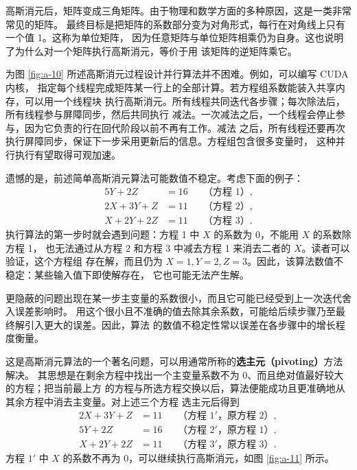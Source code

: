 高斯消元后，矩阵变成三角矩阵。由于物理和数学方面的多种原因，这是一类非常常见的矩阵。
最终目标是把矩阵的系数部分变为对角形式，每行在对角线上只有一个值 1。这称为单位矩阵，
因为任意矩阵与单位矩阵相乘仍为自身。这也说明了为什么对一个矩阵执行高斯消元，等价于用
该矩阵的逆矩阵乘它。

为图 \ref{fig:a-10} 所述高斯消元过程设计并行算法并不困难。例如，可以编写 CUDA 内核，
指定每个线程完成矩阵某一行上的全部计算。若方程组系数能装入共享内存，可以用一个线程块
执行高斯消元。所有线程共同迭代各步骤；每次除法后，所有线程参与屏障同步，然后共同执行
减法。一次减法之后，一个线程会停止参与，因为它负责的行在回代阶段以前不再有工作。减法
之后，所有线程还要再次执行屏障同步，保证下一步采用更新后的信息。方程组包含很多变量时，
这种并行执行有望取得可观加速。

遗憾的是，前述简单高斯消元算法可能数值不稳定。考虑下面的例子：
\[
\begin{aligned}
  5Y+2Z&=16 &&\text{（方程 1）},\\
  2X+3Y+Z&=11 &&\text{（方程 2）},\\
  X+2Y+2Z&=11 &&\text{（方程 3）}.
\end{aligned}
\]
执行算法的第一步时就会遇到问题：方程 1 中 $X$ 的系数为 0，不能用 $X$ 的系数除方程 1，
也无法通过从方程 2 和方程 3 中减去方程 1 来消去二者的 $X$。读者可以验证，这个方程组
存在解，而且仍为 $X=1,Y=2,Z=3$。因此，该算法数值不稳定：某些输入值下即使解存在，
它也可能无法产生解。

更隐蔽的问题出现在某一步主变量的系数很小，而且它可能已经受到上一次迭代舍入误差影响时。
用这个很小且不准确的值去除其余系数，可能给后续步骤乃至最终解引入更大的误差。因此，算法
的数值不稳定性常以误差在各步骤中的增长程度衡量。

这是高斯消元算法的一个著名问题，可以用通常所称的\textbf{选主元（pivoting）}方法解决。
其思想是在剩余方程中找出一个主变量系数不为 0、而且绝对值最好较大的方程；把当前最上方
的方程与所选方程交换以后，算法便能成功且更准确地从其余方程中消去主变量。对上述三个方程
选主元后得到
\[
\begin{aligned}
  2X+3Y+Z&=11 &&\text{（方程 $1'$，原方程 2）},\\
  5Y+2Z&=16 &&\text{（方程 $2'$，原方程 1）},\\
  X+2Y+2Z&=11 &&\text{（方程 $3'$，原方程 3）}.
\end{aligned}
\]
方程 $1'$ 中 $X$ 的系数不再为 0，可以继续执行高斯消元，如图 \ref{fig:a-11} 所示。

